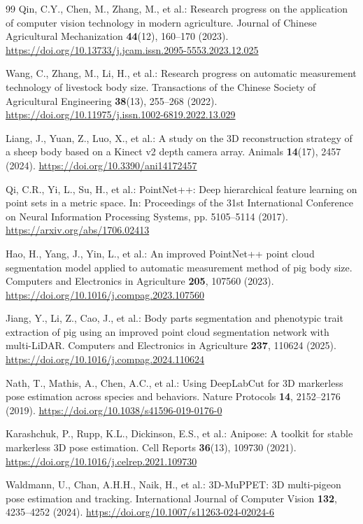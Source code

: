 \documentclass[runningheads]{llncs}
\begin{document}
\begin{thebibliography}{99}
Qin, C.Y., Chen, M., Zhang, M., et al.: Research progress on the application of computer vision technology in modern agriculture. Journal of Chinese Agricultural Mechanization \textbf{44}(12), 160--170 (2023). \url{https://doi.org/10.13733/j.jcam.issn.2095-5553.2023.12.025}

Wang, C., Zhang, M., Li, H., et al.: Research progress on automatic measurement technology of livestock body size. Transactions of the Chinese Society of Agricultural Engineering \textbf{38}(13), 255--268 (2022). \url{https://doi.org/10.11975/j.issn.1002-6819.2022.13.029}

Liang, J., Yuan, Z., Luo, X., et al.: A study on the 3D reconstruction strategy of a sheep body based on a Kinect v2 depth camera array. Animals \textbf{14}(17), 2457 (2024). \url{https://doi.org/10.3390/ani14172457}

Qi, C.R., Yi, L., Su, H., et al.: PointNet++: Deep hierarchical feature learning on point sets in a metric space. In: Proceedings of the 31st International Conference on Neural Information Processing Systems, pp. 5105--5114 (2017). \url{https://arxiv.org/abs/1706.02413}

Hao, H., Yang, J., Yin, L., et al.: An improved PointNet++ point cloud segmentation model applied to automatic measurement method of pig body size. Computers and Electronics in Agriculture \textbf{205}, 107560 (2023). \url{https://doi.org/10.1016/j.compag.2023.107560}

Jiang, Y., Li, Z., Cao, J., et al.: Body parts segmentation and phenotypic trait extraction of pig using an improved point cloud segmentation network with multi-LiDAR. Computers and Electronics in Agriculture \textbf{237}, 110624 (2025). \url{https://doi.org/10.1016/j.compag.2024.110624}

Nath, T., Mathis, A., Chen, A.C., et al.: Using DeepLabCut for 3D markerless pose estimation across species and behaviors. Nature Protocols \textbf{14}, 2152--2176 (2019). \url{https://doi.org/10.1038/s41596-019-0176-0}

Karashchuk, P., Rupp, K.L., Dickinson, E.S., et al.: Anipose: A toolkit for stable markerless 3D pose estimation. Cell Reports \textbf{36}(13), 109730 (2021). \url{https://doi.org/10.1016/j.celrep.2021.109730}

Waldmann, U., Chan, A.H.H., Naik, H., et al.: 3D-MuPPET: 3D multi-pigeon pose estimation and tracking. International Journal of Computer Vision \textbf{132}, 4235--4252 (2024). \url{https://doi.org/10.1007/s11263-024-02024-6}


\end{thebibliography}
\end{document}
